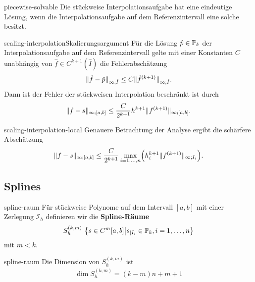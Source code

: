 \begin{Lemma}{piecewise-solvable}
  Die stückweise Interpolationsaufgabe hat eine eindeutige Lösung,
  wenn die Interpolationsaufgabe auf dem Referenzintervall eine solche
  besitzt.
\end{Lemma}

\begin{Lemma*}{scaling-interpolation}{Skalierungsargument}
  Für die Lösung $\hat p\in \P_k$ der Interpolationsaufgabe auf dem
  Referenzintervall gelte mit einer Konstanten $C$ unabhängig von
  $\hat f\in C^{k+1}(\hat I)$ die Fehlerabschätzung
  \begin{gather}
    \norm{\hat f- \hat p}_{\infty;\hat I} \le C \norm{\hat
      f^{(k+1)}}_{\infty;\hat I}.
  \end{gather}
  Dann ist der Fehler der stückweisen Interpolation beschränkt ist durch
  \begin{gather}
    \norm{f-s}_{\infty;[a,b]}
    \le \frac{C}{2^{k+1}} h^{k+1} \norm{f^{(k+1)}}_{\infty;[a,b]}.
  \end{gather}
\end{Lemma*}

\begin{Bemerkung}{scaling-interpolation-local}
  Genauere Betrachtung der Analyse ergibt die schärfere Abschätzung
  \begin{gather}
    \norm{f-s}_{\infty;[a,b]}
    \le \frac{C}{2^{k+1}} \max_{i=1,\dots,n}
    \Bigl(h_i^{k+1}\norm{f^{(k+1)}}_{\infty;I_i}\Bigr).
  \end{gather}  
\end{Bemerkung}

\subsection{Splines}

\begin{Definition}{spline-raum}
  Für stückweise Polynome auf dem Intervall $[a,b]$ mit einer
  Zerlegung $\mathcal I_h$ definieren wir die
  \textbf{Spline-Räume}
  \begin{gather}
    S^{(k,m)}_h \ \bigl\{ s\in C^m[a,b]
    \big| s_{|I_i} \in \P_k, i=1,\dots,n\bigr\}
  \end{gather}
  mit $m<k$.
\end{Definition}

\begin{Lemma}{spline-raum}
  Die Dimension von $S^{(k,m)}_h$ ist
  \begin{gather}
    \operatorname{dim}S^{(k,m)}_h = (k-m)n + m+1
  \end{gather}
\end{Lemma}

